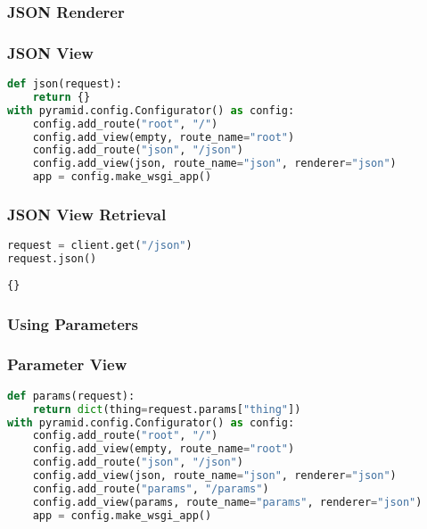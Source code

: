 \documentclass[ignorenonframetext]{beamer}
\begin{document}
\hypertarget{json-renderer}{%
\subsubsection{JSON Renderer}\label{json-renderer}}

\begin{frame}[fragile]
\frametitle{JSON View}

\begin{lstlisting}[language=Python]
def json(request):
    return {}
with pyramid.config.Configurator() as config:
    config.add_route("root", "/")
    config.add_view(empty, route_name="root")
    config.add_route("json", "/json")
    config.add_view(json, route_name="json", renderer="json")
    app = config.make_wsgi_app()
\end{lstlisting}

\end{frame}

\begin{frame}[fragile]
\frametitle{JSON View Retrieval}

\begin{lstlisting}[language=Python]
request = client.get("/json")
request.json()
\end{lstlisting}

\begin{lstlisting}
{}
\end{lstlisting}

\end{frame}

\hypertarget{using-parameters}{%
\subsubsection{Using Parameters}\label{using-parameters}}

\begin{frame}[fragile]
\frametitle{Parameter View}

\begin{lstlisting}[language=Python]
def params(request):
    return dict(thing=request.params["thing"])
with pyramid.config.Configurator() as config:
    config.add_route("root", "/")
    config.add_view(empty, route_name="root")
    config.add_route("json", "/json")
    config.add_view(json, route_name="json", renderer="json")
    config.add_route("params", "/params")
    config.add_view(params, route_name="params", renderer="json")
    app = config.make_wsgi_app()
\end{lstlisting}

\end{frame}
\end{document}
